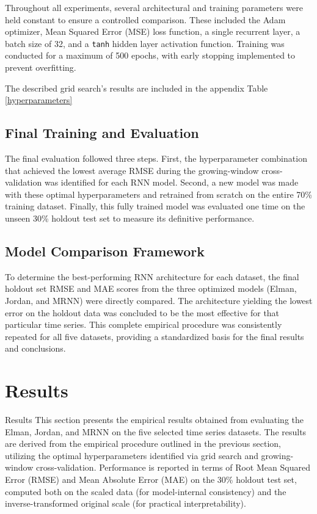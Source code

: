 \documentclass[conference, 10pt]{IEEEtran}
\begin{document}
Throughout all experiments, several architectural and training parameters were held constant to ensure a controlled
comparison. These included the Adam optimizer, Mean Squared Error (MSE) loss function, a single recurrent layer, a batch
size of 32, and a \texttt{tanh} hidden layer activation function. Training was conducted for a maximum of 500 epochs,
with early stopping implemented to prevent overfitting.

The described grid search's results are included in the appendix Table \ref{hyperparameters}

\subsection{Final Training and Evaluation}

The final evaluation followed three steps. First, the hyperparameter combination that achieved the lowest average RMSE
during the growing-window cross-validation was identified for each RNN model. Second, a new model was made with these
optimal hyperparameters and retrained from scratch on the entire 70\% training dataset. Finally, this fully trained
model was evaluated one time on the unseen 30\% holdout test set to measure its definitive performance.

\subsection{Model Comparison Framework}
To determine the best-performing RNN architecture for each dataset, the final holdout set RMSE and MAE scores from the
three optimized models (Elman, Jordan, and MRNN) were directly compared. The architecture yielding the lowest error
on the holdout data was concluded to be the most effective for that particular time series. This complete empirical
procedure was consistently repeated for all five datasets, providing a standardized basis for the final results and
conclusions.

\section{Results}
Results This section presents the empirical results obtained from evaluating the Elman, Jordan, and MRNN on the five
selected time series datasets. The results are derived from the empirical procedure outlined in the previous section,
utilizing the optimal hyperparameters identified via grid search and growing-window cross-validation. Performance is
reported in terms of Root Mean Squared Error (RMSE) and Mean Absolute Error (MAE) on the 30\% holdout test set, computed
both on the scaled data (for model-internal consistency) and the inverse-transformed original scale (for practical
interpretability).
\end{document}

